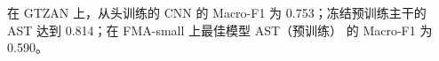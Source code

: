 在 GTZAN 上，从头训练的 CNN 的 Macro-F1 为 0.753；冻结预训练主干的 AST 达到 0.814；在 FMA-small 上最佳模型 AST（预训练） 的 Macro-F1 为 0.590。